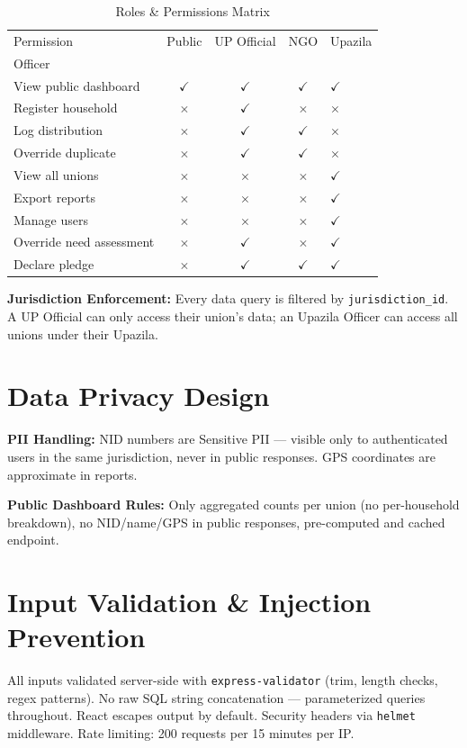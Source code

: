 \begin{table}[H]
\centering
\caption{Roles \& Permissions Matrix}
\label{tab:rbac}
\begin{tabularx}{\textwidth}{@{}lcccl@{}}
\toprule
Permission & Public & UP Official & NGO & Upazila\\ Officer \\
\midrule
View public dashboard & $\checkmark$ & $\checkmark$ & $\checkmark$ & $\checkmark$ \\
Register household & $\times$ & $\checkmark$ & $\times$ & $\times$ \\
Log distribution & $\times$ & $\checkmark$ & $\checkmark$ & $\times$ \\
Override duplicate & $\times$ & $\checkmark$ & $\checkmark$ & $\times$ \\
View all unions & $\times$ & $\times$ & $\times$ & $\checkmark$ \\
Export reports & $\times$ & $\times$ & $\times$ & $\checkmark$ \\
Manage users & $\times$ & $\times$ & $\times$ & $\checkmark$ \\
Override need assessment & $\times$ & $\checkmark$ & $\times$ & $\checkmark$ \\
Declare pledge & $\times$ & $\checkmark$ & $\checkmark$ & $\checkmark$ \\
\bottomrule
\end{tabularx}
\end{table}

\textbf{Jurisdiction Enforcement:} Every data query is filtered by \texttt{jurisdiction\_id}. A UP Official can only access their union's data; an Upazila Officer can access all unions under their Upazila.

\section{Data Privacy Design}
\textbf{PII Handling:} NID numbers are Sensitive PII --- visible only to authenticated users in the same jurisdiction, never in public responses. GPS coordinates are approximate in reports.

\textbf{Public Dashboard Rules:} Only aggregated counts per union (no per-household breakdown), no NID/name/GPS in public responses, pre-computed and cached endpoint.

\section{Input Validation \& Injection Prevention}
All inputs validated server-side with \texttt{express-validator} (trim, length checks, regex patterns). No raw SQL string concatenation --- parameterized queries throughout. React escapes output by default. Security headers via \texttt{helmet} middleware. Rate limiting: 200 requests per 15 minutes per IP.
